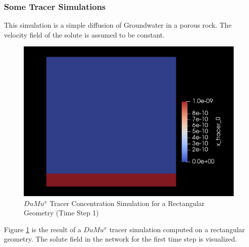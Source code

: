 
\subsubsection*{Some Tracer Simulations}
\label{Tracer}

This simulation is a simple diffusion of Groundwater in a porous rock. The velocity field of the solute is assumed to be constant.
\begin{figure}[h]
\centering
\includegraphics[width=162mm]{tracer_1}
\caption{\footnotesize $DuMu^x$ Tracer Concentration Simulation for a Rectangular Geometry (Time Step 1)}
\label{fig:tracer_1}
\end{figure}
Figure \ref{fig:tracer_1} is the result of a $DuMu^x$ tracer simulation computed on a rectangular geometry. The solute field in the network for the first time step is visualized.\\
